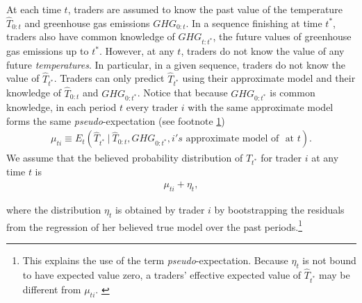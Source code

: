 \documentclass[10pt,a4paper]{article}
\begin{document}
 	   At each time $t$, traders are assumed to know the past value of the temperature $\hat{T}_{0:t}$ and greenhouse gas emissions  $GHG_{0:t}$. In a sequence finishing at time $t^*$,  traders also have common knowledge of $GHG_{t:t^*}$, the future values of greenhouse gas emissions up to $t^*$. However, at any $t$, traders do not know the value of any future \emph{temperatures}. In particular, in a given sequence, traders do not know the value of $\hat{T}_{t^*}$. Traders can only predict $\hat{T}_{t^*}$ using their approximate model and their knowledge of $\hat{T}_{0:t}$ and  $GHG_{0:t^*}$. Notice that because $GHG_{0:t^*}$ is common knowledge, in each period $t$ every trader $i$ with the same approximate model forms the same \emph{pseudo}-expectation (see footnote \ref{foot:pseudo}) 
 	   \begin{align}
 	   \label{eqref:distrib}
 	  \mu_{ti} \equiv E_t( \hat{T}_{t^*} ~|~ \hat{T}_{0:t}, GHG_{0:t^*},   i's \text{ approximate model of } \text { at } t).
 	   \end{align}
 	   We assume that the believed probability distribution of $\hat{T}_{t^*}$ for trader $i$  at any time $t$ is
 	   \begin{align*}
 	   \mu_{ti} + \eta_t,
 	   \end{align*}
 	   
 	   where the distribution $\eta_t$ is obtained by trader $i$ by bootstrapping the residuals from the regression of her believed true model over the past periods.\footnote{This explains the use of the term \emph{pseudo}-expectation. Because $\eta_t$ is not bound to have expected value zero, a traders' effective expected value of $\hat{T}_{t^*}$ may be different from $\mu_{ti}$.  \label{foot:pseudo}}       
 	   
\end{document}
